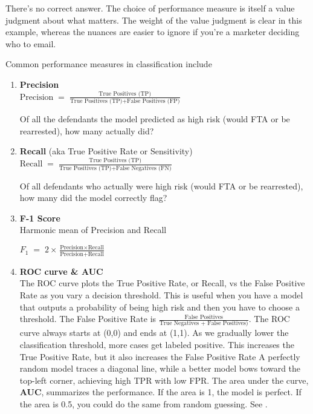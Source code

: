 There's no correct answer. The choice of performance measure is itself a value judgment about what matters. The weight of the value judgment is clear in this example, whereas the nuances are easier to ignore if you're a marketer deciding who to email.

Common performance measures in classification include

\begin{enumerate}
\item \textbf{Precision}\\
$\text{Precision} \;=\; \frac{\text{True Positives (TP)}}{\text{True Positives (TP)} + \text{False Positives (FP)}}$

Of all the defendants the model predicted as high risk (would FTA or be rearrested), how many actually did?

\item \textbf{Recall} (aka True Positive Rate or Sensitivity)\\
$\text{Recall} \;=\; \frac{\text{True Positives (TP)}}{\text{True Positives (TP)} + \text{False Negatives (FN)}}$

Of all defendants who actually were high risk (would FTA or be rearrested), how many did the model correctly flag?

\item \textbf{F-1 Score}\\
Harmonic mean of Precision and Recall

$F_1 \;=\; 2 \times \frac{\text{Precision} \times \text{Recall}}{\text{Precision} + \text{Recall}}$

\item \textbf{ROC curve \& AUC}\\
The ROC curve plots the True Positive Rate, or Recall, vs the False Positive Rate as you vary a decision threshold. This is useful when you have a model that outputs a probability of being high risk and then you have to choose a threshold. The False Positive Rate is $\frac{\text{False Positives}}{\text{True Negatives + False Positives)}}$. The ROC curve always starts at (0,0) and ends at (1,1). As we gradually lower the classification threshold, more cases get labeled positive. This increases the True Positive Rate, but it also increases the False Positive Rate A perfectly random model traces a diagonal line, while a better model bows toward the top-left corner, achieving high TPR with low FPR. The area under the curve, \textbf{AUC}, summarizes the performance. If the area is 1, the model is perfect. If the area is 0.5, you could do the same from random guessing. See \cite{fawcett2006introduction}.
\end{enumerate}


